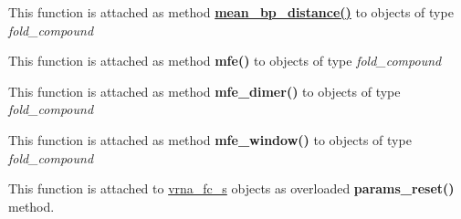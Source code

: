 \begin{DoxyRefList}
\item[\label{wrappers__wrappers000049}%
\Hypertarget{wrappers__wrappers000049}%
Global \mbox{\hyperlink{group__pf__fold_gaa6b8983b559b9ef4b2e1b31113ea317b}{vrna\+\_\+mean\+\_\+bp\+\_\+distance}} (vrna\+\_\+fold\+\_\+compound\+\_\+t $\ast$vc)]This function is attached as method {\bfseries \mbox{\hyperlink{group__pf__fold_ga79cbc375af65f11609feb6b055269e7d}{mean\+\_\+bp\+\_\+distance()}}} to objects of type {\itshape fold\+\_\+compound}  
\item[\label{wrappers__wrappers000039}%
\Hypertarget{wrappers__wrappers000039}%
Global \mbox{\hyperlink{group__mfe__fold_gabd3b147371ccf25c577f88bbbaf159fd}{vrna\+\_\+mfe}} (vrna\+\_\+fold\+\_\+compound\+\_\+t $\ast$vc, char $\ast$structure)]This function is attached as method {\bfseries mfe()} to objects of type {\itshape fold\+\_\+compound}  
\item[\label{wrappers__wrappers000040}%
\Hypertarget{wrappers__wrappers000040}%
Global \mbox{\hyperlink{group__mfe__cofold_gaab22d10c1190f205f16a77cab9d5d3ee}{vrna\+\_\+mfe\+\_\+dimer}} (vrna\+\_\+fold\+\_\+compound\+\_\+t $\ast$vc, char $\ast$structure)]This function is attached as method {\bfseries mfe\+\_\+dimer()} to objects of type {\itshape fold\+\_\+compound}  
\item[\label{wrappers__wrappers000041}%
\Hypertarget{wrappers__wrappers000041}%
Global \mbox{\hyperlink{group__local__mfe__fold_ga689df235a1915a1ad56e377383c044ce}{vrna\+\_\+mfe\+\_\+window}} (vrna\+\_\+fold\+\_\+compound\+\_\+t $\ast$vc, F\+I\+LE $\ast$file)]This function is attached as method {\bfseries mfe\+\_\+window()} to objects of type {\itshape fold\+\_\+compound}  
\item[\label{wrappers__wrappers000045}%
\Hypertarget{wrappers__wrappers000045}%
Global \mbox{\hyperlink{group__energy__parameters_gac40dc82e48a72a97cfc58b9da08a7792}{vrna\+\_\+params\+\_\+reset}} (vrna\+\_\+fold\+\_\+compound\+\_\+t $\ast$vc, vrna\+\_\+md\+\_\+t $\ast$md\+\_\+p)]This function is attached to \mbox{\hyperlink{group__fold__compound_structvrna__fc__s}{vrna\+\_\+fc\+\_\+s}} objects as overloaded {\bfseries params\+\_\+reset()} method.


\end{DoxyRefList}
